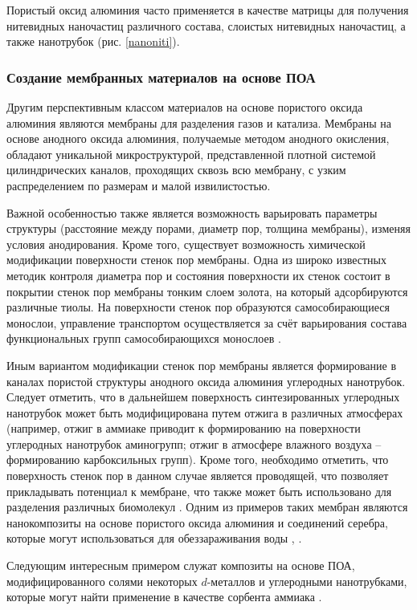 Пористый оксид алюминия часто применяется в качестве матрицы для получения нитевидных наночастиц различного состава, слоистых нитевидных наночастиц, а также нанотрубок (рис. \ref{nanoniti}).

\subsubsection{Создание мембранных материалов на основе ПОА}

Другим перспективным классом материалов на основе пористого оксида алюминия являются мембраны для разделения газов и катализа. Мембраны на основе анодного оксида алюминия, получаемые методом анодного окисления, обладают уникальной микроструктурой, представленной плотной системой цилиндрических каналов, проходящих сквозь всю мембрану, с узким распределением по размерам и малой извилистостью. 

Важной особенностью также является возможность варьировать параметры структуры (расстояние между порами, диаметр пор, толщина мембраны), изменяя условия анодирования. Кроме того, существует возможность химической модификации поверхности стенок пор мембраны.  Одна из широко известных методик контроля диаметра пор и состояния поверхности их стенок состоит в покрытии стенок пор мембраны тонким слоем золота, на который адсорбируются различные тиолы. На поверхности стенок пор образуются самособирающиеся монослои, управление транспортом осуществляется за счёт варьирования состава функциональных групп самособирающихся монослоев \cite{petukhov}.

Иным вариантом модификации стенок пор мембраны является формирование в каналах пористой структуры анодного оксида алюминия углеродных нанотрубок. Следует отметить, что в дальнейшем поверхность синтезированных углеродных нанотрубок может быть модифицирована путем отжига в различных атмосферах (например, отжиг в аммиаке приводит к формированию на поверхности углеродных нанотрубок аминогрупп; отжиг в атмосфере влажного воздуха – формированию карбоксильных групп). Кроме того, необходимо отметить, что поверхность стенок пор в данном случае является проводящей, что позволяет прикладывать потенциал к мембране, что также может быть использовано для разделения различных биомолекул \cite{petukhov}. Одним из примеров таких мембран являются нанокомпозиты на основе пористого оксида алюминия и соединений серебра, которые могут использоваться для обеззараживания воды \cite{zolotukhina-voda}, \cite{zolotukhina-nanoporous}.

Следующим интересным примером служат композиты на основе ПОА, модифицированного солями некоторых $d$-металлов и углеродными нанотрубками, которые могут найти применение в качестве сорбента аммиака \cite{vorobyova-ammiak}. 


